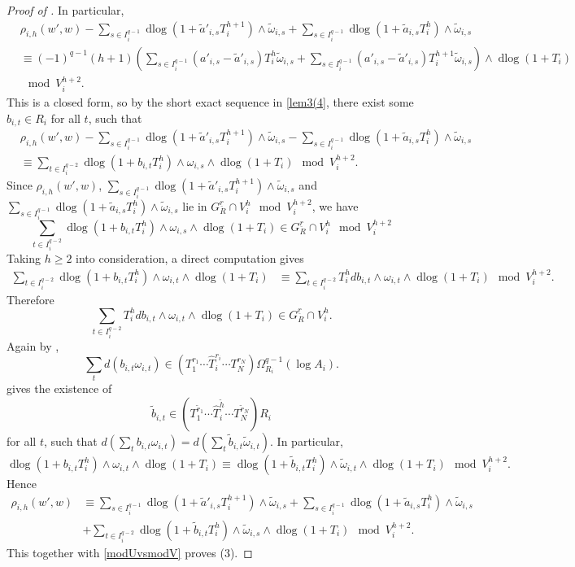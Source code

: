 \documentclass[11pt]{amsart}
\newcommand{\dlog}{\operatorname{dlog}}
\renewcommand{\hat}{\widehat}
\newcommand{\ul}{\underline}
\renewcommand{\tilde}{\widetilde}
\theoremstyle{plain}
\theoremstyle{definition}
\numberwithin{equation}{prop}
\begin{document}
\begin{proof}[Proof of ]
In particular,
\begin{align*}
&
\rho_{i,h}(
w',w
)-
\sum_{s\in I_i^{q-1}} \dlog(1+\tilde a'_{i,s}T_i^{h+1})\wedge\tilde\omega_{i,s}
+
\sum_{s\in I_i^{q-1}} \dlog(1+\tilde a_{i,s}T_i^{h})\wedge\tilde \omega_{i,s}
\\
&\equiv 
(-1)^{q-1}(h+1)
\left(
\sum_{s\in I_i^{q-1}} 
(a'_{i,s}-\tilde a'_{i,s})T_i^{h}\tilde\omega_{i,s}
+
\sum_{s\in I_i^{q-1}} 
(a'_{i,s}-\tilde a'_{i,s})T_i^{h+1}\tilde\omega_{i,s}
\right)\wedge \dlog (1+T_i)
\\&\mod V_i^{h+2}.
\end{align*}
This is a closed form, so by the short exact sequence in \eqref{lem3(4}, there exist some 
$b_{i,t}\in R_i$ for all $t$, such that
\begin{align*} 
&\rho_{i,h}(
w',w
)-
\sum_{s\in I_i^{q-1}} \dlog(1+\tilde a'_{i,s}T_i^{h+1})\wedge\tilde\omega_{i,s}
-
\sum_{s\in I_i^{q-1}} \dlog(1+\tilde a_{i,s}T_i^{h})\wedge\tilde \omega_{i,s}
\\
&\equiv \sum_{t\in I_i^{q-2}} \dlog(1+b_{i,t}T_i^{h})\wedge\omega_{i,s}\wedge 
\dlog (1+T_i)
\mod V_i^{h+2}.
\end{align*}
Since 
$\rho_{i,h}(
w',w
)$, $
\sum_{s\in I_i^{q-1}} \dlog(1+\tilde a'_{i,s}T_i^{h+1})\wedge\tilde\omega_{i,s}$ and 
$
\sum_{s\in I_i^{q-1}} \dlog(1+\tilde a_{i,s}T_i^{h})\wedge\tilde\omega_{i,s}$
lie in $G_R^{\ul r}\cap V_i^h \mod  V_i^{h+2}$,
we have
$$\sum_{t\in I_i^{q-2}} \dlog(1+b_{i,t}T_i^{h})\wedge\omega_{i,s}\wedge 
\dlog (1+T_i)
\in G_R^{\ul r}\cap V_i^h \mod  V_i^{h+2}$$
Taking $h\ge 2$ into consideration, a direct computation gives
\begin{align*}
\sum_{t\in I_i^{q-2}} \dlog(1+b_{i,t}T_i^{h})\wedge\omega_{i,t}\wedge \dlog (1+T_i)
&\equiv 
\sum_{t\in I_i^{q-2}}
T_i^h db_{i,t}\wedge\omega_{i,t}\wedge \dlog (1+T_i)
\mod V_i^{h+2}.
\end{align*}
Therefore
$$\sum_{t\in I_i^{q-2}}
T_i^h db_{i,t}\wedge\omega_{i,t}\wedge \dlog (1+T_i)
\in 
G_R^{\ul r}\cap V_i^h.
$$
Again by , 
$$\sum_t d(b_{i,t}\omega_{i,t})\in (T_1^{r_1}\cdots\hat T_i^{r_i}\cdots  T_N^{r_N})\Omega^{q-1}_{R_i}(\log A_i).$$
 gives the existence of 
$$\tilde b_{i,t}\in (T_1^{\tilde r_1}\cdots \hat T_i^{\tilde h}\cdots T_N^{\tilde r_N})R_i$$
for all $t$, such that
$d(\sum_t b_{i,t}\omega_{i,t})=d(\sum_t \tilde b_{i,t}\tilde \omega_{i,t}).$
In particular, 
$$\dlog(1+b_{i,t}T_i^{h})\wedge\omega_{i,t}\wedge \dlog (1+T_i)
\equiv 
\dlog(1+\tilde b_{i,t}T_i^{h})\wedge\tilde \omega_{i,t}\wedge \dlog (1+T_i)
\mod V_i^{h+2}.$$
Hence
\begin{align*}
\rho_{i,h}(w',w)
&\equiv
\sum_{s\in I_i^{q-1}} \dlog(1+\tilde a'_{i,s}T_i^{h+1})\wedge\tilde\omega_{i,s}
+
\sum_{s\in I_i^{q-1}} \dlog(1+\tilde a_{i,s}T_i^{h})\wedge\tilde\omega_{i,s}
\\
&+ \sum_{t\in I_i^{q-2}} \dlog(1+\tilde b_{i,t}T_i^{h})\wedge\tilde\omega_{i,s}\wedge 
\dlog (1+T_i)
\mod V_i^{h+2}.
\end{align*}
This together with \eqref{modUvsmodV} proves (3).


\end{proof}
\end{document}
